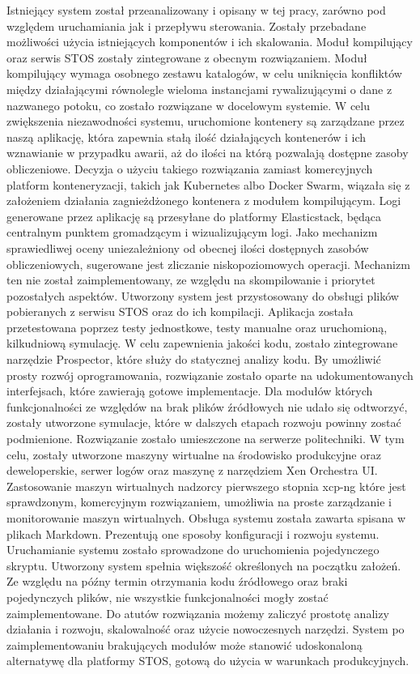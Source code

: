 Istniejący system został przeanalizowany i opisany w tej pracy, zarówno pod względem uruchamiania jak i przepływu sterowania. Zostały przebadane możliwości użycia istniejących komponentów i ich skalowania. Moduł kompilujący oraz serwis STOS zostały zintegrowane z obecnym rozwiązaniem. Moduł kompilujący wymaga osobnego zestawu katalogów, w celu uniknięcia konfliktów między działającymi równolegle wieloma instancjami rywalizującymi o dane z nazwanego potoku, co zostało rozwiązane w docelowym systemie. 
\newline \indent W celu zwiększenia niezawodności systemu, uruchomione kontenery są zarządzane przez naszą aplikację, która zapewnia stałą ilość działających kontenerów i ich wznawianie w przypadku awarii, aż do ilości na którą pozwalają dostępne zasoby obliczeniowe. Decyzja o użyciu takiego rozwiązania zamiast komercyjnych platform konteneryzacji, takich jak Kubernetes albo Docker Swarm, wiązała się z założeniem działania zagnieżdżonego kontenera z modułem kompilującym. Logi generowane przez aplikację są przesyłane do platformy Elasticstack, będąca centralnym punktem gromadzącym i wizualizującym logi. Jako mechanizm sprawiedliwej oceny uniezależniony od obecnej ilości dostępnych zasobów obliczeniowych, sugerowane jest zliczanie niskopoziomowych operacji. Mechanizm ten nie został zaimplementowany, ze względu na skompilowanie i priorytet pozostałych aspektów.
\newline \indent Utworzony system jest przystosowany do obsługi plików pobieranych z serwisu STOS oraz do ich kompilacji. Aplikacja została przetestowana poprzez testy jednostkowe, testy manualne oraz uruchomioną, kilkudniową symulację. W celu zapewnienia jakości kodu, zostało zintegrowane narzędzie Prospector, które służy do statycznej analizy kodu. By umożliwić prosty rozwój oprogramowania, rozwiązanie zostało oparte na udokumentowanych interfejsach, które zawierają gotowe implementacje. Dla modułów których funkcjonalności ze względów na brak plików źródłowych nie udało się odtworzyć, zostały utworzone symulacje, które w dalszych etapach rozwoju powinny zostać podmienione.
\newline \indent Rozwiązanie zostało umieszczone na serwerze politechniki. W tym celu, zostały utworzone maszyny wirtualne na środowisko produkcyjne oraz deweloperskie, serwer logów oraz maszynę z narzędziem Xen Orchestra UI. Zastosowanie maszyn wirtualnych nadzorcy pierwszego stopnia xcp-ng które jest sprawdzonym, komercyjnym rozwiązaniem, umożliwia na proste zarządzanie i monitorowanie maszyn wirtualnych.
\newline \indent Obsługa systemu została zawarta spisana w plikach Markdown. Prezentują one sposoby konfiguracji i rozwoju systemu. Uruchamianie systemu zostało sprowadzone do uruchomienia pojedynczego skryptu.
\newline \indent Utworzony system spełnia większość określonych na początku założeń. Ze względu na późny termin otrzymania kodu źródłowego oraz braki pojedynczych plików, nie wszystkie funkcjonalności mogły zostać zaimplementowane. Do atutów rozwiązania możemy zaliczyć prostotę analizy działania i rozwoju, skalowalność oraz użycie nowoczesnych narzędzi. System po zaimplementowaniu brakujących modułów może stanowić udoskonaloną alternatywę dla platformy STOS, gotową do użycia w warunkach produkcyjnych.
